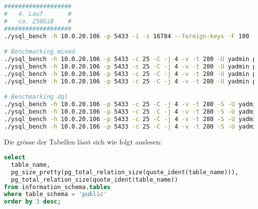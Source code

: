 \begin{flushleft}
\begin{lstlisting}[language=bash, caption=YugabyteDB - Benchmarking-Commands,captionpos=b,label={lst:yugabytedb-benchmarking-commands},breaklines=true]
###################
#   4. Lauf       #
#   ca. 250GiB    #
###################
./ysql_bench -h 10.0.20.106 -p 5433 -i -s 16784 --foreign-keys -F 100 -I dtgvpf --index-tablespace=eval_index_tablespace --tablespace=eval_data_tablespace -U yadmin pgbench_eval_bench

# Benchmarking mixed
./ysql_bench -h 10.0.20.106 -p 5433 -c 25 -C -j 4 -v -t 280 -U yadmin pgbench_eval_bench > /home/gramic/4_1_yugabytedb_mixed_benchmark.txt
./ysql_bench -h 10.0.20.106 -p 5433 -c 25 -C -j 4 -v -t 280 -U yadmin pgbench_eval_bench > /home/gramic/4_2_yugabytedb_mixed_benchmark.txt
./ysql_bench -h 10.0.20.106 -p 5433 -c 25 -C -j 4 -v -t 280 -U yadmin pgbench_eval_bench > /home/gramic/4_3_yugabytedb_mixed_benchmark.txt
./ysql_bench -h 10.0.20.106 -p 5433 -c 25 -C -j 4 -v -t 280 -U yadmin pgbench_eval_bench > /home/gramic/4_4_yugabytedb_mixed_benchmark.txt

# Benchmarking dql
./ysql_bench -h 10.0.20.106 -p 5433 -c 25 -C -j 4 -v -t 280 -S -U yadmin pgbench_eval_bench > /home/gramic/4_1_yugabytedb_dql_benchmark.txt
./ysql_bench -h 10.0.20.106 -p 5433 -c 25 -C -j 4 -v -t 280 -S -U yadmin pgbench_eval_bench > /home/gramic/4_2_yugabytedb_dql_benchmark.txt
./ysql_bench -h 10.0.20.106 -p 5433 -c 25 -C -j 4 -v -t 280 -S -U yadmin pgbench_eval_bench > /home/gramic/4_3_yugabytedb_dql_benchmark.txt
./ysql_bench -h 10.0.20.106 -p 5433 -c 25 -C -j 4 -v -t 280 -S -U yadmin pgbench_eval_bench > /home/gramic/4_4_yugabytedb_dql_benchmark.txt
\end{lstlisting}
\end{flushleft}
\begin{flushleft}
    Die grösse der Tabellen lässt sich wie folgt auslesen:
\lstset{style=gra_codestyle}
\begin{lstlisting}[language=sql, caption=yugabyteDB - Benchmarking - Table Size SQL,captionpos=b,label={lst:yugabytedb-benchmarking-table-size-sql},breaklines=true]
select
  table_name,
  pg_size_pretty(pg_total_relation_size(quote_ident(table_name))),
  pg_total_relation_size(quote_ident(table_name))
from information_schema.tables
where table_schema = 'public'
order by 3 desc;
\end{lstlisting}
\end{flushleft}